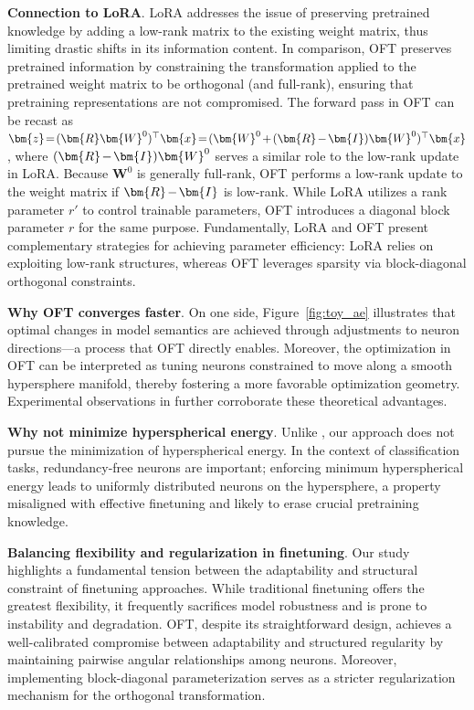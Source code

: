 {\textbf{Connection to LoRA}. LoRA addresses the issue of preserving pretrained knowledge by adding a low-rank matrix to the existing weight matrix, thus limiting drastic shifts in its information content. In comparison, OFT preserves pretrained information by constraining the transformation applied to the pretrained weight matrix to be orthogonal (and full-rank), ensuring that pretraining representations are not compromised. The forward pass in OFT can be recast as $\thickmuskip=2mu \medmuskip=2mu \bm{z}=(\bm{R}\bm{W}^0)^\top\bm{x}=(\bm{W}^0+(\bm{R}-\bm{I})\bm{W}^0)^\top\bm{x}$, where $\thickmuskip=2mu \medmuskip=2mu (\bm{R}-\bm{I})\bm{W}^0$ serves a similar role to the low-rank update in LoRA. Because $\bm{W}^0$ is generally full-rank, OFT performs a low-rank update to the weight matrix if $\thickmuskip=2mu \medmuskip=2mu \bm{R}-\bm{I}$ is low-rank. While LoRA utilizes a rank parameter $r'$ to control trainable parameters, OFT introduces a diagonal block parameter $r$ for the same purpose. Fundamentally, LoRA and OFT present complementary strategies for achieving parameter efficiency: LoRA relies on exploiting low-rank structures, whereas OFT leverages sparsity via block-diagonal orthogonal constraints.

\textbf{Why OFT converges faster}. On one side, Figure~\ref{fig:toy_ae} illustrates that optimal changes in model semantics are achieved through adjustments to neuron directions—a process that OFT directly enables. Moreover, the optimization in OFT can be interpreted as tuning neurons constrained to move along a smooth hypersphere manifold, thereby fostering a more favorable optimization geometry. Experimental observations in \cite{liu2021orthogonal} further corroborate these theoretical advantages.

\textbf{Why not minimize hyperspherical energy}. Unlike \cite{liu2021orthogonal}, our approach does not pursue the minimization of hyperspherical energy. In the context of classification tasks, redundancy-free neurons are important; enforcing minimum hyperspherical energy leads to uniformly distributed neurons on the hypersphere, a property misaligned with effective finetuning and likely to erase crucial pretraining knowledge.

\textbf{Balancing flexibility and regularization in finetuning}. Our study highlights a fundamental tension between the adaptability and structural constraint of finetuning approaches. While traditional finetuning offers the greatest flexibility, it frequently sacrifices model robustness and is prone to instability and degradation. OFT, despite its straightforward design, achieves a well-calibrated compromise between adaptability and structured regularity by maintaining pairwise angular relationships among neurons. Moreover, implementing block-diagonal parameterization serves as a stricter regularization mechanism for the orthogonal transformation.

}
